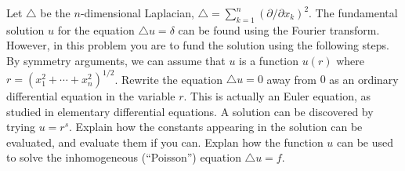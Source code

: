 Let $\triangle $ be the $n$-dimensional Laplacian, $\triangle
=\sum_{k=1}^n(\partial/\partial x_k)^2$. The fundamental solution $u$
for the equation $\triangle u=\delta$ can be found using the Fourier
transform. However, in this problem you are to fund the solution using
the following steps. By symmetry arguments, we can assume that $u$ is
a function $u(r)$ where $r=(x_1^2+\cdots+x_n^2)^{1/2}$. Rewrite the
equation $\triangle u=0$ away from $0$ as an ordinary differential
equation in the variable $r$. This is actually an Euler equation, as
studied in elementary differential equations. A solution can be
discovered by trying $u=r^s$. Explain how the constants appearing in
the solution can be evaluated, and evaluate them if you can. Explan
how the function $u$ can be used to solve the inhomogeneous (``Poisson'')
equation $\triangle u=f$.
